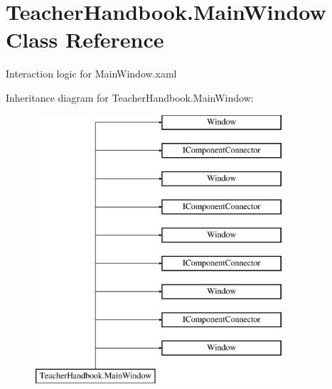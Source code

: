 \hypertarget{class_teacher_handbook_1_1_main_window}{}\section{Teacher\+Handbook.\+Main\+Window Class Reference}
\label{class_teacher_handbook_1_1_main_window}


Interaction logic for Main\+Window.\+xaml  


Inheritance diagram for Teacher\+Handbook.\+Main\+Window\+:\begin{figure}[H]
\begin{center}
\leavevmode
\includegraphics[height=10.000000cm]{df/d32/class_teacher_handbook_1_1_main_window}
\end{center}
\end{figure}
